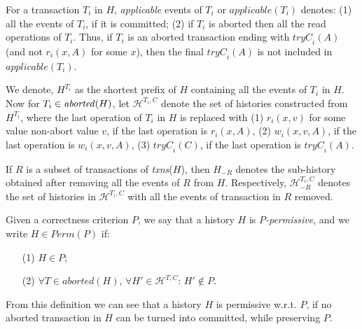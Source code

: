 \documentclass{llncs}
\newcommand{\cmnt}[1]{}
\def\H{\ensuremath{\mathcal{H}}}
\newcommand{\id}[1]{\mbox{\textit{#1}}}\newcommand{\res}[1]{\mbox{\textbf{#1}}}
\newcommand{\op} {operation}
\newcommand{\aborted}{\textit{aborted}}
\newcommand{\txns}{\textit{txns}}
\newcommand{\permfn}[1] {\textit{Perm}(#1)}
\newcommand{\subs}[2]  {\textit{subC}(#2,#1)}
\newcommand{\sub}[2]  {\textit{subC}(#2,#1)}
\newcommand{\applfn}[2]  {applicable(#1)}
\newcommand{\appl}  {applicable}
\newcommand{\tryc} {\textit{tryC}}
\begin{document}
For a transaction  $T_i$ in $H$, \emph{\appl{}} events of $T_i$ or $\applfn{T_i}{H}$ denotes: (1) all the events of $T_i$, if it is committed; (2) if $T_i$ is aborted then all the read \op{s} of $T_i$. Thus, if $T_i$ is an aborted transaction ending with $\tryc_i(A)$ (and not $r_i(x,A)$ for some $x$), then the final $\tryc_i(A)$ is not included in $\applfn{T_i}{H}$. 

We denote, $H^{T_i}$ as the shortest prefix of $H$ containing all the events of $T_i$ in $H$. Now for $T_i\in\id{aborted}(H)$, let $\H^{T_i,C}$ denote the set of histories constructed from $H^{T_i}$, where the last operation of $T_i$ in $H$ is replaced with (1) $r_i(x,v)$ for some value non-abort value $v$, if the last operation is $r_i(x,A)$, (2) $w_i(x,v,A)$, if the last operation is $w_i(x,v,A)$, (3) $\tryc_i(C)$, if the last operation is $\tryc_i(A)$.


If $R$ is a subset of transactions of \txns($H$), then $H_{-R}$
denotes the sub-history obtained after removing all the events of $R$
from $H$. 
Respectively, $\H^{T_i,C}_{-R}$ denotes the set of histories in
$\H^{T_i,C}$ with all the events of transaction in $R$ removed.




\cmnt{
We define a variant of $\subs{T_i}{H}$, $\sub{T_i}{H}$ is the of sub-history of $H$ consisting of events from the set of committed transactions of $H$ and the events of $T_i$ \emph{up to} the last event of $T_i$, where, in case $T_i$ is aborted in $H$, the last operation of $T_i$ in $H$ is replaced with $\tryc_i(C)$,
and in case $T_i$ is incomplete in $H$, $\tryc_i(C)$ is added right after the last event of $T_i$. Formally, $\sub{T_i}{H} = \subs{T_i}{H}^{T_i,C}$ (notice that $\sub{T_i}{H}$ is not necessarily a sub-history in $H$, since some events of $H$ are modified).

If $R$ is a subset of transactions of \txns($H$), then $H_{-R}$
denotes the sub-history obtained after removing all the events of $R$
from $H$.  Thus, $\H^{T,\textbf{C}}_{-R}$ denotes the set of histories
obtained by replacing the response of the terminal \op{} of $T$ with a
non-abort value (as shown above) in the sub-history formed by removing
all the events of $R$ from $H$. 
}



\begin{definition}
\label{def:perm}
Given a correctness criterion $P$, we say that a history $H$ is
\emph{$P$-permissive}, and we write $H \in \permfn{P}$ if: 
\begin{enumerate}
\item[(1)] $H \in P$; 
\item[(2)] $\forall T \in \aborted(H)$, $\forall H' \in \H^{T,C}$: $H' \notin P$. 
\end{enumerate}
\end{definition} 
From this definition we can see that a history $H$ is permissive
w.r.t. $P$, if no aborted transaction in $H$ can be turned into
committed, while preserving $P$. 
\cmnt{It must be noted that in the above definition, the aborted
transaction $T$ is treated as read-only. }
\end{document}
